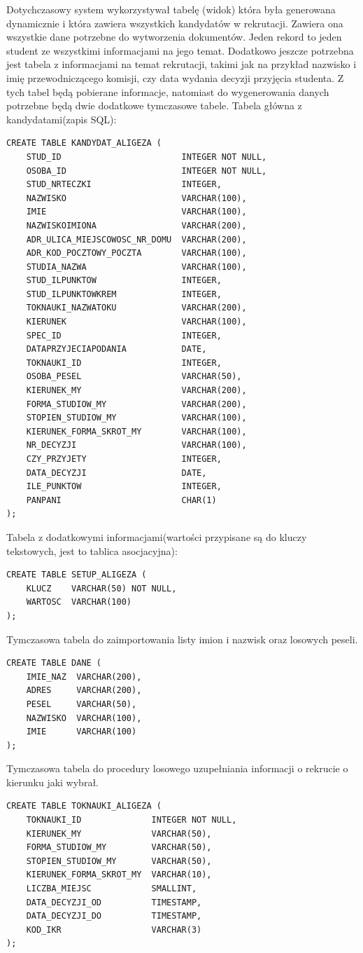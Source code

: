 Dotychczasowy system wykorzystywał tabelę (widok) która była generowana dynamicznie i która zawiera wszystkich kandydatów w rekrutacji. Zawiera ona wszystkie dane potrzebne do wytworzenia dokumentów. Jeden rekord to jeden student ze wszystkimi informacjami na jego temat. Dodatkowo jeszcze potrzebna jest tabela z informacjami na temat rekrutacji, takimi jak na przykład nazwisko i imię przewodniczącego komisji, czy data wydania decyzji przyjęcia studenta. Z tych tabel będą pobierane informacje, natomiast do wygenerowania danych potrzebne będą dwie dodatkowe tymczasowe tabele.
Tabela główna z kandydatami(zapis SQL):
\begin{lstlisting}
CREATE TABLE KANDYDAT_ALIGEZA (
    STUD_ID                        INTEGER NOT NULL,
    OSOBA_ID                       INTEGER NOT NULL,
    STUD_NRTECZKI                  INTEGER,
    NAZWISKO                       VARCHAR(100),
    IMIE                           VARCHAR(100),
    NAZWISKOIMIONA                 VARCHAR(200),
    ADR_ULICA_MIEJSCOWOSC_NR_DOMU  VARCHAR(200),
    ADR_KOD_POCZTOWY_POCZTA        VARCHAR(100),
    STUDIA_NAZWA                   VARCHAR(100),
    STUD_ILPUNKTOW                 INTEGER,
    STUD_ILPUNKTOWKREM             INTEGER,
    TOKNAUKI_NAZWATOKU             VARCHAR(200),
    KIERUNEK                       VARCHAR(100),
    SPEC_ID                        INTEGER,
    DATAPRZYJECIAPODANIA           DATE,
    TOKNAUKI_ID                    INTEGER,
    OSOBA_PESEL                    VARCHAR(50),
    KIERUNEK_MY                    VARCHAR(200),
    FORMA_STUDIOW_MY               VARCHAR(200),
    STOPIEN_STUDIOW_MY             VARCHAR(100),
    KIERUNEK_FORMA_SKROT_MY        VARCHAR(100),
    NR_DECYZJI                     VARCHAR(100),
    CZY_PRZYJETY                   INTEGER,
    DATA_DECYZJI                   DATE,
    ILE_PUNKTOW                    INTEGER,
    PANPANI                        CHAR(1)
);
\end{lstlisting}
Tabela z dodatkowymi informacjami(wartości przypisane są do kluczy tekstowych, jest to tablica asocjacyjna):
\begin{lstlisting}
CREATE TABLE SETUP_ALIGEZA (
    KLUCZ    VARCHAR(50) NOT NULL,
    WARTOSC  VARCHAR(100)
);
\end{lstlisting}
Tymczasowa tabela do zaimportowania listy imion i nazwisk oraz losowych peseli.
\begin{lstlisting}
CREATE TABLE DANE (
    IMIE_NAZ  VARCHAR(200),
    ADRES     VARCHAR(200),
    PESEL     VARCHAR(50),
    NAZWISKO  VARCHAR(100),
    IMIE      VARCHAR(100)
);
\end{lstlisting}
Tymczasowa tabela do procedury losowego uzupełniania informacji o rekrucie o kierunku jaki wybrał.
\begin{lstlisting}
CREATE TABLE TOKNAUKI_ALIGEZA (
    TOKNAUKI_ID              INTEGER NOT NULL,
    KIERUNEK_MY              VARCHAR(50),
    FORMA_STUDIOW_MY         VARCHAR(50),
    STOPIEN_STUDIOW_MY       VARCHAR(50),
    KIERUNEK_FORMA_SKROT_MY  VARCHAR(10),
    LICZBA_MIEJSC            SMALLINT,
    DATA_DECYZJI_OD          TIMESTAMP,
    DATA_DECYZJI_DO          TIMESTAMP,
    KOD_IKR                  VARCHAR(3)
);
\end{lstlisting}

